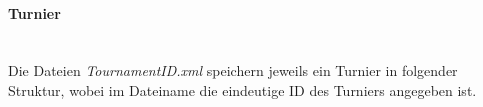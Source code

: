 \documentclass[11pt]{article}
\newcommand{\subsubsubsection}[1]{\paragraph{#1}\mbox{}\\}
\begin{document}

\subsubsubsection{Turnier}

Die Dateien \textit{TournamentID.xml} speichern jeweils ein Turnier in folgender Struktur, wobei im Dateiname die eindeutige ID des Turniers angegeben ist.
\end{document}
